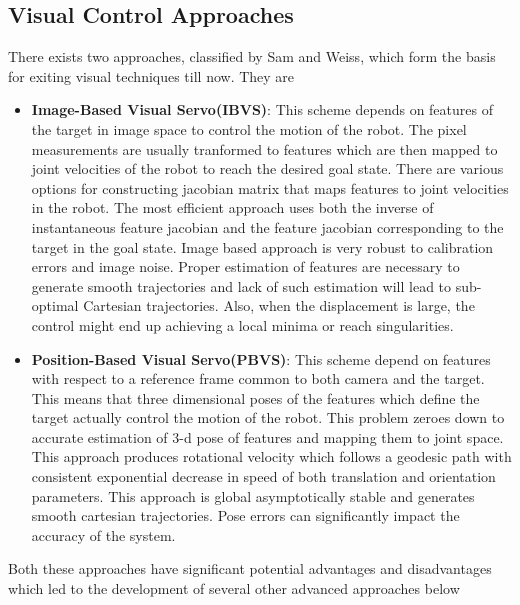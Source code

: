 \subsection{Visual Control Approaches}
There exists two approaches, classified by Sam and Weiss\cite{Jablokow1997}, which form the basis for exiting visual techniques till now. They are
\begin{itemize}
    \item \textbf{Image-Based Visual Servo(IBVS)}: This scheme depends on features of the target in image space to control the motion of the robot. The pixel measurements are usually tranformed to features which are then mapped to joint velocities of the robot to reach the desired goal state. There are various options for constructing jacobian matrix that maps features to joint velocities in the robot. The most efficient approach uses both the inverse of instantaneous feature jacobian and the feature jacobian  corresponding to the target in the goal state. Image based approach is very robust to calibration errors and image noise. Proper estimation of features are necessary to generate smooth trajectories and lack of such estimation will lead to sub-optimal Cartesian trajectories. Also, when the displacement is large, the control might 
    end up achieving a local minima or reach singularities\cite{Hutchinson2006}.
    
    \item \textbf{Position-Based Visual Servo(PBVS)}:  This scheme depend on features with respect to a reference frame common to both camera and the target. This means that three dimensional poses of the features which define the target actually control the motion of the robot. This problem zeroes down to accurate estimation of 3-d pose of features and mapping them to joint space. This approach produces rotational velocity which follows a geodesic path with consistent exponential decrease in speed of both translation and orientation parameters. This approach is global asymptotically stable and generates smooth cartesian trajectories. Pose errors can significantly impact the accuracy of the system.

\end{itemize}
    
    Both these approaches have significant potential advantages and disadvantages\cite{Hutchinson2006} which led to the development of several other advanced approaches below
